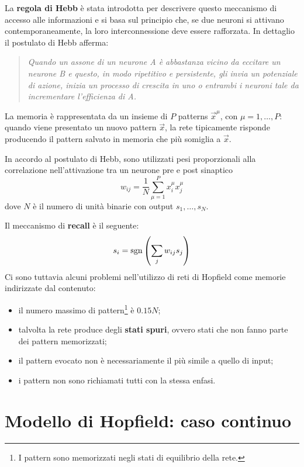La \textbf{regola di Hebb} è stata introdotta per descrivere questo meccanismo di accesso alle informazioni e si basa sul principio che, se due neuroni si attivano contemporaneamente, la loro interconnessione deve essere rafforzata. In dettaglio il postulato di Hebb afferma:
\begin{quote}
	\emph{Quando un assone di un neurone A è abbastanza vicino da eccitare un neurone B e questo, in modo ripetitivo e persistente, gli invia un potenziale di azione, inizia un processo di crescita in uno o entrambi i neuroni tale da incrementare l'efficienza di A.}
\end{quote}
La memoria è rappresentata da un insieme di $P$ patterns $\vec{x}^\mu$, con $\mu = 1, \dots, P$: quando viene presentato un nuovo pattern $\vec{x}$, la rete tipicamente risponde producendo il pattern salvato in memoria che più somiglia a $\vec{x}$.

In accordo al postulato di Hebb, sono utilizzati pesi proporzionali alla correlazione nell'attivazione tra un neurone pre e post sinaptico
\begin{displaymath}
	w_{ij} = \frac{1}{N} \sum_{\mu = 1}^P x_i^\mu x_j^\mu
\end{displaymath}
dove $N$ è il numero di unità binarie con output $s_1, \dots, s_N$.

Il meccanismo di \textbf{recall} è il seguente:
\begin{displaymath}
	s_i = \operatorname*{sgn}\left(\sum_j w_{ij} s_j \right)
\end{displaymath}
Ci sono tuttavia alcuni problemi nell'utilizzo di reti di Hopfield come memorie indirizzate dal contenuto:
\begin{itemize}
	\item il numero massimo di pattern\footnote{I pattern sono memorizzati negli stati di equilibrio della rete.} è $0.15 N$;
	\item talvolta la rete produce degli \textbf{stati spuri}, ovvero stati che non fanno parte dei pattern memorizzati;
	\item il pattern evocato non è necessariamente il più simile a quello di input;
	\item i pattern non sono richiamati tutti con la stessa enfasi.
\end{itemize}

\section{Modello di Hopfield: caso continuo}
\label{sec:modello_di_hopfield_caso_continuo}

